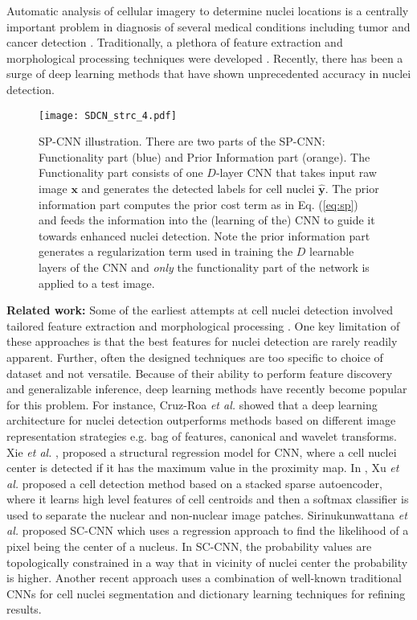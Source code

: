 \documentclass{article}
\begin{document}
Automatic analysis of cellular imagery to determine nuclei locations is a centrally important problem in diagnosis of several medical conditions including tumor and cancer detection \cite{SC_CNN}. Traditionally, a plethora of feature extraction and morphological processing techniques were developed \cite{veta2014breast}. Recently, there has been a surge of deep learning methods that have shown unprecedented accuracy in nuclei detection. 
\begin{figure*}[ht!]
	\centering
	\texttt{[image: SDCN\_strc\_4.pdf]}\vspace{-1pt}
	\caption{\ninept SP-CNN illustration. There are two parts of the SP-CNN: Functionality part (blue) and Prior Information part (orange). The Functionality part consists of one $D$-layer CNN that takes input raw image $\mathbf{x}$ and generates the detected labels for cell nuclei $\mathbf{\hat{y}}$. The prior information part computes the prior cost term as in Eq. (\ref{eq:sp}) and feeds the information into the (learning of the) CNN to guide it towards enhanced nuclei detection. Note the prior information part generates a regularization term used in training the $D$ learnable layers of the CNN and {\em only} the functionality part of the network is applied to a test image.}\vspace{-8pt}
	\label{fig:diagram}
\end{figure*}

\textbf{Related work:} Some of the earliest attempts at cell nuclei detection involved tailored feature extraction and morphological processing \cite{LIPSyM,veta2014breast,al2010improved,Ali_SP_2012}. One key limitation of these approaches is that the best features for nuclei detection are rarely readily apparent. Further, often the designed techniques are too specific to choice of dataset and not versatile. Because of their ability to perform feature discovery and generalizable inference, deep learning methods have recently become popular for this problem. For instance, Cruz-Roa \textit{et al.} \cite{Cruz-Roa2013} showed that a deep learning architecture for nuclei detection outperforms methods based on different image representation strategies e.g. bag of features, canonical and wavelet transforms. Xie \textit{et al.} \cite{Xie2015}, proposed a structural regression model for CNN, where a cell nuclei center is detected if it has the maximum value in the proximity map. In \cite{Xu2016}, Xu \textit{et al.} proposed a cell detection method based on a stacked sparse autoencoder, where it learns high level features of cell centroids and then a softmax classifier is used to separate the nuclear and non-nuclear image patches. Sirinukunwattana \textit{et al.} proposed SC-CNN \cite{SC_CNN} which uses a regression approach to find the likelihood of a pixel being the center of a nucleus. In SC-CNN, the probability values are topologically constrained in a way that in vicinity of nuclei center the probability is higher. Another recent approach \cite{Xing2016} uses a combination of well-known traditional CNNs for cell nuclei segmentation and dictionary learning techniques for refining results.
\end{document}
